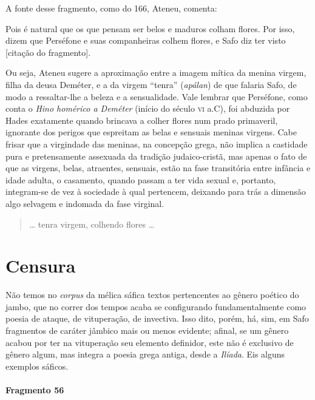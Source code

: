 {\small A fonte desse fragmento, como do 166, Ateneu, comenta: 

\begin{hedraquote}
Pois é natural
que os que pensam ser belos e maduros colham flores. Por isso, dizem que
Perséfone e suas companheiras colhem flores, e Safo diz ter visto 
[citação do fragmento].
\end{hedraquote}

 Ou seja, Ateneu sugere a aproximação entre a imagem
mítica da menina virgem, filha da deusa Deméter, e a da virgem ``tenra”
(\textit{apálan}) de que falaria Safo, de modo a ressaltar-lhe a beleza e a
sensualidade. Vale lembrar que Perséfone, como conta o \textit{Hino homérico a Deméter} 
(início do século \textsc{vi} a.C), foi abduzida por Hades exatamente
quando brincava a colher flores num prado primaveril, ignorante dos perigos que
espreitam as belas e sensuais meninas virgens. Cabe frisar que a virgindade das
meninas, na concepção grega, não implica a castidade pura e pretensamente
assexuada da tradição judaico-cristã, mas apenas o fato de que as virgens,
belas, atraentes, sensuais, estão na fase transitória entre infância e idade
adulta, o casamento, quando passam a ter vida sexual e, portanto, integram-se
de vez à sociedade à qual pertencem, deixando para trás a dimensão algo
selvagem e indomada da fase virginal.}

\begin{verse}
\ldots{} tenra virgem, colhendo flores \ldots{}
\end{verse}


\section{Censura}

Não temos no \textit{corpus }da mélica sáfica textos pertencentes ao gênero
poético do jambo, que no correr dos tempos acaba se configurando fundamentalmente como poesia de
ataque, de vituperação, de invectiva. Isso dito, porém, há, sim, em Safo
fragmentos de caráter jâmbico mais ou menos evidente; afinal, se um gênero
acabou por ter na vituperação seu elemento definidor, este não é exclusivo de
gênero algum, mas integra a poesia grega antiga, desde a \textit{Ilíada}. Eis
alguns exemplos sáficos.

\paragraph{Fragmento 56}

